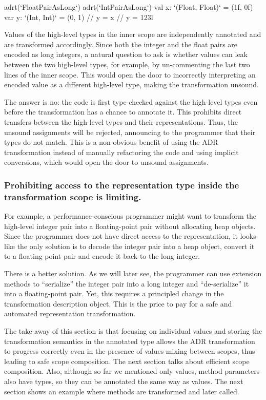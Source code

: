 \begin{lstlisting-nobreak}
adrt(`FloatPairAsLong`) {
  adrt(`IntPairAsLong`) {
    val x: `(Float, Float)` = (1f, 0f)
    var y: `(Int, Int)` = (0, 1)
    // y = x
    // y = 123l
  }
}
\end{lstlisting-nobreak}

Values of the high-level types in the inner scope are independently annotated and are transformed accordingly. Since both the integer and the float pairs are encoded as long integers, a natural question to ask is whether values can leak between the two high-level types, for example, by un-commenting the last two lines of the inner scope. This would open the door to incorrectly interpreting an encoded value as a different high-level type, making the transformation unsound.

The answer is no: the code is first type-checked against the high-level types even before the \inject{} transformation has a chance to annotate it. This prohibits direct transfers between the high-level types and their representations. Thus, the unsound assignments will be rejected, announcing to the programmer that their types do not match. This is a non-obvious benefit of using the ADR transformation instead of manually refactoring the code and using implicit conversions, which would open the door to unsound assignments.


\subsubsection{Prohibiting access to the representation type inside the transformation scope is limiting.} For example, a performance-conscious programmer might want to transform the high-level integer pair into a floating-point pair without allocating heap objects. Since the programmer does not have direct access to the representation, it looks like the only solution is to decode the integer pair into a heap object, convert it to a floating-point pair and encode it back to the long integer.

There is a better solution. As we will later see, the programmer can use extension methods to ``serialize'' the integer pair into a long integer and ``de-serialize'' it into a floating-point pair. Yet, this requires a principled change in the transformation description object. This is the price to pay for a safe and automated representation transformation.

The take-away of this section is that focusing on individual values and storing the transformation semantics in the annotated type allows the ADR transformation to progress correctly even in the presence of values mixing between scopes, thus leading to safe scope composition. The next section talks about efficient scope composition. Also, although so far we mentioned only values, method parameters also have types, so they can be annotated the same way as values. The next section shows an example where methods are transformed and later called.








